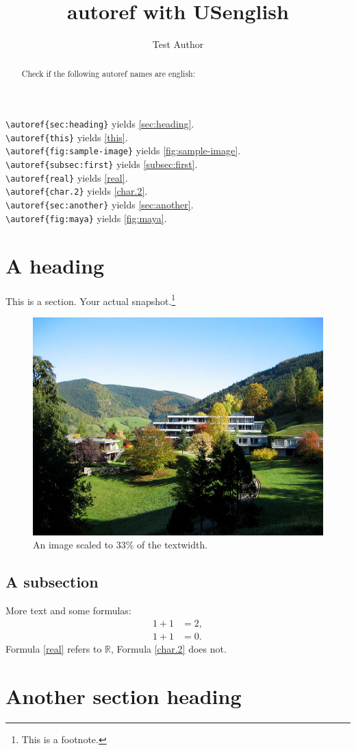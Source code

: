 \documentclass{snapshotmfo}
\author{Test Author}
\title{autoref with USenglish}
\begin{document}
\begin{abstract}
Check if the following autoref names are english:
\end{abstract}

\noindent \verb+\autoref{sec:heading}+ yields \autoref{sec:heading}.\\
\verb+\autoref{this}+ yields \autoref{this}.\\
\verb+\autoref{fig:sample-image}+ yields \autoref{fig:sample-image}.\\
\verb+\autoref{subsec:first}+ yields \autoref{subsec:first}.\\
\verb+\autoref{real}+ yields \autoref{real}.\\
\verb+\autoref{char.2}+ yields \autoref{char.2}.\\
\verb+\autoref{sec:another}+ yields \autoref{sec:another}.\\
\verb+\autoref{fig:maya}+ yields \autoref{fig:maya}.\\


\section{A heading}
\label{sec:heading}
This is a section.
Your actual snapshot.\footnote{This is a footnote.\label{this}}

\begin{figure}[ht]
        \centering 
        \includegraphics[width= 0.33 \textwidth]{mfo.jpg}
        \caption{An image scaled to 33\% of the textwidth.}
\label{fig:sample-image}
\end{figure}

\subsection{A subsection}
\label{subsec:first}
More text and some formulas:
\begin{align}\label{real}
1+1&=2,\\\label{char.2}
1+1&=0.
\end{align}
Formula \eqref{real} refers to $\mathbb{R}$, Formula \eqref{char.2} does not.


\section{Another section heading}
\label{sec:another}
\end{document}
